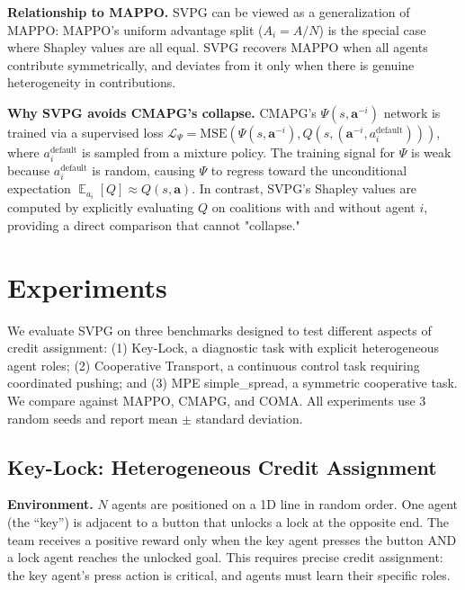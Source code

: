 \documentclass[11pt,a4paper]{article}
\DeclareMathOperator*{\E}{\mathbb{E}}
\begin{document}
\textbf{Relationship to MAPPO.} SVPG can be viewed as a generalization of MAPPO: MAPPO's uniform advantage split ($A_i = A/N$) is the special case where Shapley values are all equal. SVPG recovers MAPPO when all agents contribute symmetrically, and deviates from it only when there is genuine heterogeneity in contributions.

\textbf{Why SVPG avoids CMAPG's collapse.} CMAPG's $\Psi(s,\mathbf{a}^{-i})$ network is trained via a supervised loss $\mathcal{L}_\Psi = \text{MSE}(\Psi(s,\mathbf{a}^{-i}), Q(s,(\mathbf{a}^{-i}, a_i^{\text{default}})))$, where $a_i^{\text{default}}$ is sampled from a mixture policy. The training signal for $\Psi$ is weak because $a_i^{\text{default}}$ is random, causing $\Psi$ to regress toward the unconditional expectation $\E_{a_i}[Q] \approx Q(s,\mathbf{a})$. In contrast, SVPG's Shapley values are computed by explicitly evaluating $Q$ on coalitions with and without agent $i$, providing a direct comparison that cannot "collapse."

\section{Experiments}

We evaluate SVPG on three benchmarks designed to test different aspects of credit assignment: (1) Key-Lock, a diagnostic task with explicit heterogeneous agent roles; (2) Cooperative Transport, a continuous control task requiring coordinated pushing; and (3) MPE simple\_spread, a symmetric cooperative task. We compare against MAPPO, CMAPG, and COMA. All experiments use 3 random seeds and report mean $\pm$ standard deviation.

\subsection{Key-Lock: Heterogeneous Credit Assignment}

\textbf{Environment.} $N$ agents are positioned on a 1D line in random order. One agent (the ``key'') is adjacent to a button that unlocks a lock at the opposite end. The team receives a positive reward only when the key agent presses the button AND a lock agent reaches the unlocked goal. This requires precise credit assignment: the key agent's press action is critical, and agents must learn their specific roles.
\end{document}
